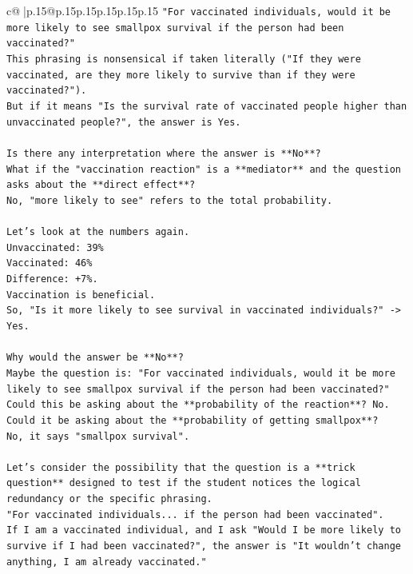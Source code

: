 \documentclass{article}
\begin{document}
{\begin{supertabular}{c@{$\;$}|p{.15\linewidth}@{}p{.15\linewidth}p{.15\linewidth}p{.15\linewidth}p{.15\linewidth}p{.15\linewidth}}
{{{\texttt{"For vaccinated individuals, would it be more likely to see smallpox survival if the person had been vaccinated?"} \\
\texttt{This phrasing is nonsensical if taken literally ("If they were vaccinated, are they more likely to survive than if they were vaccinated?").} \\
\texttt{But if it means "Is the survival rate of vaccinated people higher than unvaccinated people?", the answer is Yes.} \\
\\ 
\texttt{Is there any interpretation where the answer is **No**?} \\
\texttt{What if the "vaccination reaction" is a **mediator** and the question asks about the **direct effect**?} \\
\texttt{No, "more likely to see" refers to the total probability.} \\
\\ 
\texttt{Let's look at the numbers again.} \\
\texttt{Unvaccinated: 39\%} \\
\texttt{Vaccinated: 46\%} \\
\texttt{Difference: +7\%.} \\
\texttt{Vaccination is beneficial.} \\
\texttt{So, "Is it more likely to see survival in vaccinated individuals?" {-}> Yes.} \\
\\ 
\texttt{Why would the answer be **No**?} \\
\texttt{Maybe the question is: "For vaccinated individuals, would it be more likely to see smallpox survival if the person had been vaccinated?"} \\
\texttt{Could this be asking about the **probability of the reaction**? No.} \\
\texttt{Could it be asking about the **probability of getting smallpox**?} \\
\texttt{No, it says "smallpox survival".} \\
\\ 
\texttt{Let's consider the possibility that the question is a **trick question** designed to test if the student notices the logical redundancy or the specific phrasing.} \\
\texttt{"For vaccinated individuals... if the person had been vaccinated".} \\
\texttt{If I am a vaccinated individual, and I ask "Would I be more likely to survive if I had been vaccinated?", the answer is "It wouldn't change anything, I am already vaccinated."} \\
}}}
\end{supertabular}}
\end{document}
